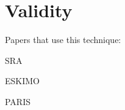 \section{Validity} 
\label{sec:val}

Papers that use this technique:

SRA\cite{sra}

ESKIMO\cite{eskimo}

PARIS\cite{rioparis}